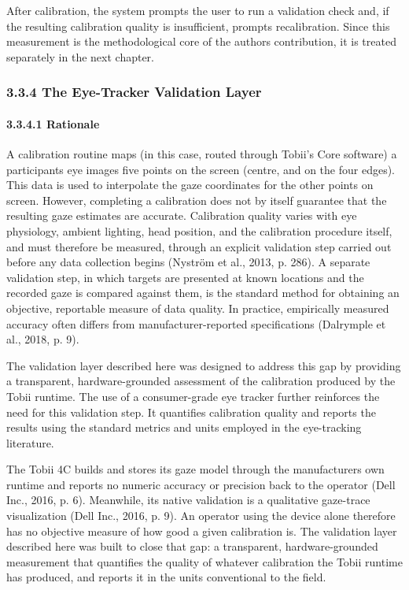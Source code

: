 \documentclass[
]{article}
\begin{document}
After calibration, the system prompts the user to run a validation check and, if the resulting calibration quality is insufficient, prompts recalibration. Since this measurement is the methodological core of the author\textquotesingle s contribution, it is treated separately in the next chapter.

\hypertarget{the-eye-tracker-validation-layer}{%
\subsubsection{\texorpdfstring{3.3.4 The Eye-Tracker Validation Layer }{3.3.4 The Eye-Tracker Validation Layer }}\label{the-eye-tracker-validation-layer}}

\hypertarget{rationale}{%
\paragraph{3.3.4.1 Rationale}\label{rationale}}

A calibration routine maps (in this case, routed through Tobii's Core software) a participant\textquotesingle s eye images five points on the screen (centre, and on the four edges). This data is used to interpolate the gaze coordinates for the other points on screen. However, completing a calibration does not by itself guarantee that the resulting gaze estimates are accurate. Calibration quality varies with eye physiology, ambient lighting, head position, and the calibration procedure itself, and must therefore be measured, through an explicit validation step carried out before any data collection begins (Nyström et al., 2013, p. 286). A separate validation step, in which targets are presented at known locations and the recorded gaze is compared against them, is the standard method for obtaining an objective, reportable measure of data quality. In practice, empirically measured accuracy often differs from manufacturer-reported specifications (Dalrymple et al., 2018, p. 9).

The validation layer described here was designed to address this gap by providing a transparent, hardware-grounded assessment of the calibration produced by the Tobii runtime. The use of a consumer-grade eye tracker further reinforces the need for this validation step. It quantifies calibration quality and reports the results using the standard metrics and units employed in the eye-tracking literature.

The Tobii 4C builds and stores its gaze model through the manufacturer\textquotesingle s own runtime and reports no numeric accuracy or precision back to the operator (Dell Inc., 2016, p. 6). Meanwhile, its native validation is a qualitative gaze-trace visualization (Dell Inc., 2016, p. 9). An operator using the device alone therefore has no objective measure of how good a given calibration is. The validation layer described here was built to close that gap: a transparent, hardware-grounded measurement that quantifies the quality of whatever calibration the Tobii runtime has produced, and reports it in the units conventional to the field.
\end{document}
